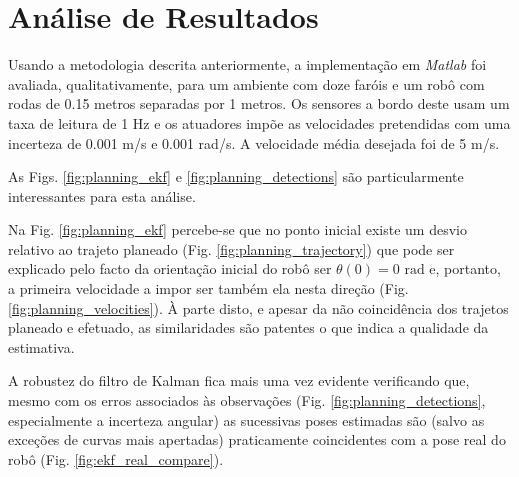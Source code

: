 \documentclass{article}
\begin{document}
\section{Análise de Resultados}

Usando a metodologia descrita anteriormente, a implementação em \textit{Matlab} foi avaliada, qualitativamente, para um ambiente com doze faróis e um robô com rodas de 0.15 metros separadas por 1 metros. Os sensores a bordo deste usam um taxa de leitura de 1 Hz e os atuadores impõe as velocidades pretendidas com uma incerteza de 0.001 m/s e 0.001 rad/s. A velocidade média desejada foi de 5 m/s.

As Figs. \ref{fig:planning_ekf} e \ref{fig:planning_detections} são particularmente interessantes para esta análise. 

Na Fig. \ref{fig:planning_ekf} percebe-se que no ponto inicial existe um desvio relativo ao trajeto planeado (Fig. \ref{fig:planning_trajectory}) que pode ser explicado pelo facto da orientação inicial do robô ser $\theta(0) = 0 \text{ rad}$ e, portanto, a primeira velocidade a impor ser também ela nesta direção (Fig. \ref{fig:planning_velocities}). À parte disto, e apesar da não coincidência dos trajetos planeado e efetuado, as similaridades são patentes o que indica a qualidade da estimativa.

A robustez do filtro de Kalman fica mais uma vez evidente verificando que, mesmo com os erros associados às observações (Fig. \ref{fig:planning_detections}, especialmente a incerteza angular) as sucessivas poses estimadas são (salvo as exceções de curvas mais apertadas) praticamente coincidentes com a pose real do robô (Fig. \ref{fig:ekf_real_compare}).
\end{document}
